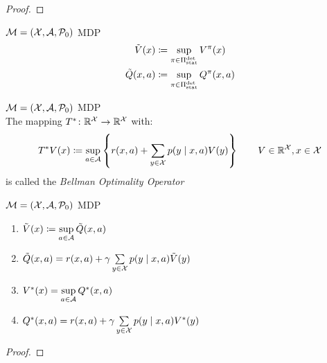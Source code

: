 \begin{proof}
\end{proof}
\begin{definition}\(\mathcal{M}=(\mathcal{X},\mathcal{A},\mathcal{P}_0)\) MDP
\begin{align*}
	\tilde{V}(x)&\coloneqq \sup_{\pi\in\Pi_{\textnormal{stat}}^{\textnormal{det}}} V^\pi(x)\\
	\tilde{Q}(x,a)&\coloneqq\sup_{\pi\in\Pi_{\textnormal{stat}}^{\textnormal{det}}}Q^\pi(x,a)
\end{align*}
\end{definition}
\begin{definition}\(\mathcal{M}=(\mathcal{X},\mathcal{A},\mathcal{P}_0)\) MDP\\
The mapping \(T^*\colon\mathbb{R}^{\mathcal{X}}\to\mathbb{R}^{\mathcal{X}}\) with:
	\[
	 T^* V(x)\coloneqq \sup_{a\in\mathcal{A}}\left\{r(x,a)+\sum_{y\in\mathcal{X}}p(y\mid x,a) V(y)\right\} \qquad V\in\mathbb{R}^{\mathcal{X}}, x\in\mathcal{X}
	\]
is called the \emph{Bellman Optimality Operator}
\end{definition}
\begin{lemma}\label{V*,Q* relation}\(\mathcal{M}=(\mathcal{X},\mathcal{A},\mathcal{P}_0)\) MDP
\begin{enumerate}[label=\textbf{(\roman*)},font=\normalfont]
\item \(\tilde{V}(x)\coloneqq\sup\limits_{a\in\mathcal{A}} \tilde{Q}(x,a)\)
\item \( \tilde{Q}(x,a) = r(x,a)+\gamma\sum\limits_{y\in\mathcal{X}}p(y\mid x,a)\tilde{V}(y) \)
\item\label{i:3} \(V^*(x)=\sup\limits_{a\in\mathcal{A}}Q^*(x,a)\)
\item\label{i:4} \(Q^*(x,a)=r(x,a)+\gamma \sum\limits_{y\in\mathcal{X}}p(y\mid x,a) V^*(y)\)
\end{enumerate}
\end{lemma}
\begin{proof}
\end{proof}

